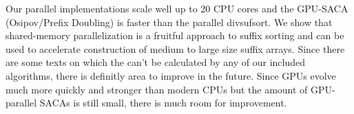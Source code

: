 Our parallel implementations scale well up to 20 CPU cores and the GPU-SACA (Osipov/Prefix Doubling) is faster than the parallel divsufsort.
We show that shared-memory parallelization is a fruitful approach to suffix sorting
and can be used to accelerate construction of medium to large size suffix arrays.
Since there are some texts on which the \sa can't be calculated by any of our included algorithms,
there is definitly area to improve in the future.
Since GPUs evolve much more quickly and stronger than modern CPUs
but the amount of GPU-parallel SACAs is still small, there is much room for improvement.

